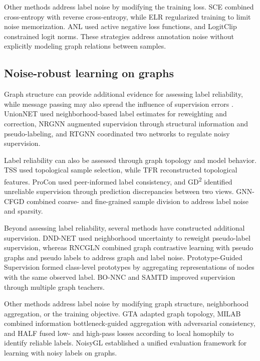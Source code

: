 \documentclass[10pt,letterpaper,nopreprintline]{elsarticle}
\theoremstyle{plain}
\begin{document}
Other methods address label noise by modifying the training loss. SCE \cite{ref23} combined cross-entropy with reverse cross-entropy, while ELR \cite{ref24} regularized training to limit noise memorization. ANL \cite{ref25} used active negative loss functions, and LogitClip \cite{ref26} constrained logit norms. These strategies address annotation noise without explicitly modeling graph relations between samples.

\subsection{Noise-robust learning on graphs}\label{sec:2.2}

Graph structure can provide additional evidence for assessing label reliability, while message passing may also spread the influence of supervision errors \cite{ref6}. UnionNET \cite{ref27} used neighborhood-based label estimates for reweighting and correction, NRGNN \cite{ref7} augmented supervision through structural information and pseudo-labeling, and RTGNN \cite{ref8} coordinated two networks to regulate noisy supervision.

Label reliability can also be assessed through graph topology and model behavior. TSS \cite{ref9} used topological sample selection, while TFR \cite{ref28} reconstructed topological features. ProCon \cite{ref29} used peer-informed label consistency, and GD\textsuperscript{2} \cite{ref30} identified unreliable supervision through prediction discrepancies between two views. GNN-CFGD \cite{ref31} combined coarse- and fine-grained sample division to address label noise and sparsity.

Beyond assessing label reliability, several methods have constructed additional supervision. DND-NET \cite{ref32} used neighborhood uncertainty to reweight pseudo-label supervision, whereas RNCGLN \cite{ref33} combined graph contrastive learning with pseudo graphs and pseudo labels to address graph and label noise. Prototype-Guided Supervision \cite{ref34} formed class-level prototypes by aggregating representations of nodes with the same observed label. BO-NNC \cite{ref35} and SAMTD \cite{ref36} improved supervision through multiple graph teachers.

Other methods address label noise by modifying graph structure, neighborhood aggregation, or the training objective. GTA \cite{ref37} adapted graph topology, MILAB \cite{ref38} combined information bottleneck-guided aggregation with adversarial consistency, and HALF \cite{ref39} fused low- and high-pass losses according to local homophily to identify reliable labels. NoisyGL \cite{ref6} established a unified evaluation framework for learning with noisy labels on graphs.
\end{document}
